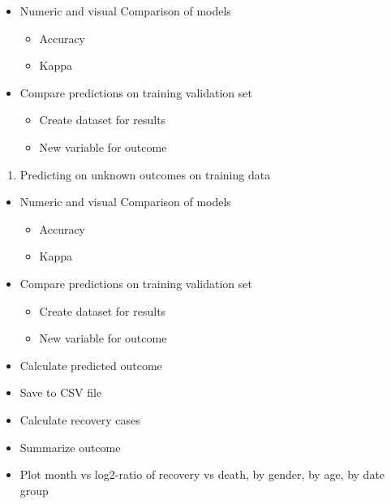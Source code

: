 \documentclass[]{book}
\providecommand{\tightlist}{%
  \setlength{\itemsep}{0pt}\setlength{\parskip}{0pt}}
\begin{document}
\begin{itemize}
\tightlist
\item
  Numeric and visual Comparison of models

  \begin{itemize}
  \tightlist
  \item
    Accuracy
  \item
    Kappa
  \end{itemize}
\item
  Compare predictions on training validation set

  \begin{itemize}
  \tightlist
  \item
    Create dataset for results
  \item
    New variable for outcome
  \end{itemize}
\end{itemize}

\begin{enumerate}
\def\labelenumi{\arabic{enumi}.}
\setcounter{enumi}{10}
\tightlist
\item
  Predicting on unknown outcomes on training data\\
\end{enumerate}

\begin{itemize}
\tightlist
\item
  Numeric and visual Comparison of models

  \begin{itemize}
  \tightlist
  \item
    Accuracy
  \item
    Kappa
  \end{itemize}
\item
  Compare predictions on training validation set

  \begin{itemize}
  \tightlist
  \item
    Create dataset for results
  \item
    New variable for outcome
  \end{itemize}
\item
  Calculate predicted outcome
\item
  Save to CSV file
\item
  Calculate recovery cases
\item
  Summarize outcome
\item
  Plot month vs log2-ratio of recovery vs death, by gender, by age, by date group
\end{itemize}
\end{document}
